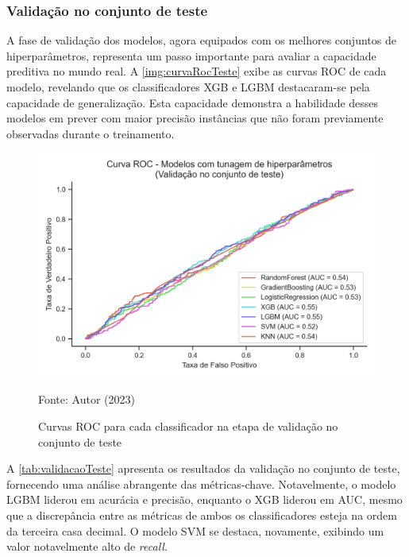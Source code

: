 \subsubsection{Validação no conjunto de teste}

A fase de validação dos modelos, agora equipados com os melhores conjuntos de hiperparâmetros, representa um passo importante para avaliar a capacidade preditiva no mundo real. A \autoref{img:curvaRocTeste} exibe as curvas ROC de cada modelo, revelando que os classificadores XGB e LGBM destacaram-se pela capacidade de generalização. Esta capacidade demonstra a habilidade desses modelos em prever com maior precisão instâncias que não foram previamente observadas durante o treinamento.

\begin{figure}[H]
	\centering
	\caption{\label{img:curvaRocTeste}Curvas ROC para cada classificador na etapa de validação no conjunto de teste}
	\includegraphics[scale=0.7]{USPSC-img/curva_roc_modelos_teste.png}
	\begin{center}
		Fonte: Autor (2023)
	\end{center}
\end{figure}

A \autoref{tab:validacaoTeste} apresenta os resultados da validação no conjunto de teste, fornecendo uma análise abrangente das métricas-chave. Notavelmente, o modelo LGBM liderou em acurácia e precisão, enquanto o XGB liderou em AUC, mesmo que a discrepância entre as métricas de ambos os classificadores esteja na ordem da terceira casa decimal. O modelo SVM se destaca, novamente, exibindo um valor notavelmente alto de \textit{recall}.

